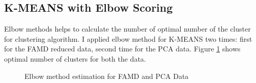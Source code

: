 \documentclass[12pt]{article}
\begin{document}
\subsection{K-MEANS with Elbow Scoring}
Elbow methods helps to calculate the number of optimal number of the cluster for clustering algorithm. I applied elbow method for K-MEANS two times: first for the FAMD reduced data, second time for the PCA data. Figure \ref{fig:elbow_result} shows optimal number of clusters for both the data.

\begin{figure}[h!]
	\centering
	\qquad
	\caption{Elbow method estimation for FAMD and PCA Data}%
	\label{fig:elbow_result}%
\end{figure}
\end{document}
